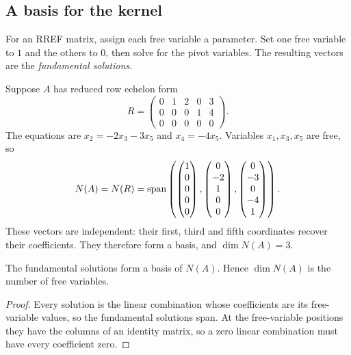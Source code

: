 \subsection{A basis for the kernel}

For an RREF matrix, assign each free variable a parameter.
Set one free variable to $1$ and the others to $0$, then solve for the
pivot variables. The resulting vectors are the \emph{fundamental solutions}.

\begin{example}
Suppose $A$ has reduced row echelon form
\[
 R=\begin{pmatrix}0&1&2&0&3\\0&0&0&1&4\\0&0&0&0&0\end{pmatrix}.
\]
The equations are $x_2=-2x_3-3x_5$ and $x_4=-4x_5$.
Variables $x_1,x_3,x_5$ are free, so
\[
 N(A)=N(R)=\operatorname{span}\left(
 \begin{pmatrix}1\\0\\0\\0\\0\end{pmatrix},
 \begin{pmatrix}0\\-2\\1\\0\\0\end{pmatrix},
 \begin{pmatrix}0\\-3\\0\\-4\\1\end{pmatrix}\right).
\]
These vectors are independent: their first, third and fifth coordinates
recover their coefficients. They therefore form a basis, and $\dim N(A)=3$.
\end{example}

\begin{proposition}
The fundamental solutions form a basis of $N(A)$. Hence $\dim N(A)$
is the number of free variables.
\end{proposition}
\begin{proof}
Every solution is the linear combination whose coefficients are its
free-variable values, so the fundamental solutions span.
At the free-variable positions they have the columns of an identity
matrix, so a zero linear combination must have every coefficient zero.
\end{proof}

